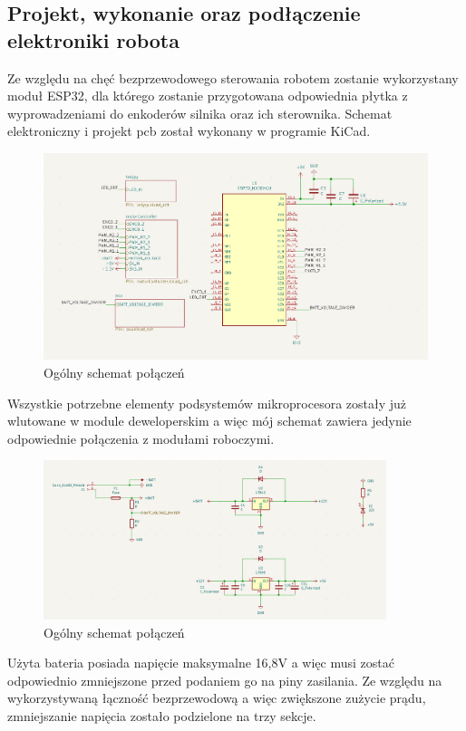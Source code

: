 \subsection{Projekt, wykonanie oraz podłączenie elektroniki robota}
Ze względu na chęć bezprzewodowego sterowania robotem zostanie wykorzystany moduł ESP32, dla którego zostanie przygotowana odpowiednia płytka 
z wyprowadzeniami do enkoderów silnika oraz ich sterownika. Schemat elektroniczny i projekt pcb został wykonany w programie KiCad. 
\begin{figure}[H]
	\centering
	\includegraphics[width=13cm]{pages/robot/zdjecia/kicad/schematCaly.png}
	\caption{Ogólny schemat połączeń}
	\label{Fig:Rysunek}
\end{figure}
Wszystkie potrzebne elementy podsystemów mikroprocesora zostały już wlutowane w module deweloperskim
a więc mój schemat zawiera jedynie odpowiednie połączenia z modułami roboczymi.
\begin{figure}[H]
	\centering
	\includegraphics[width=10cm]{pages/robot/zdjecia/kicad/schematZasilanie.png}
	\caption{Ogólny schemat połączeń}
	\label{Fig:Rysunek}
\end{figure}
Użyta bateria posiada napięcie maksymalne 16,8V a więc musi zostać odpowiednio zmniejszone przed podaniem go na piny zasilania. 
Ze względu na wykorzystywaną łączność bezprzewodową a więc zwiększone zużycie prądu, zmniejszanie napięcia zostało podzielone na trzy sekcje. 

